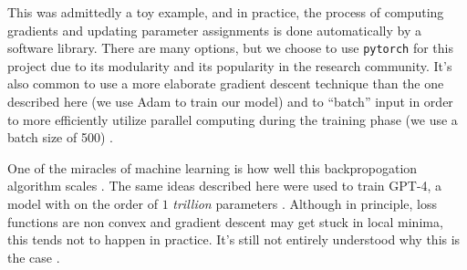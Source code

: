 This was admittedly a toy example, and in practice, the process of computing gradients and updating parameter assignments is done automatically by a software library. There are many options, but we choose to use \texttt{pytorch} \cite{pytorch} for this project due to its modularity and its popularity in the research community. It's also common to use a more elaborate gradient descent technique than the one described here (we use Adam \cite{adam} to train our model) and to ``batch'' input in order to more efficiently utilize parallel computing during the training phase (we use a batch size of 500) \cite[\S 10.7.2]{ISL}.

One of the miracles of machine learning is how well this backpropogation algorithm scales \cite[\S 13.2.6]{PML}. The same ideas described here were used to train GPT-4, a model with on the order of $1$ \emph{trillion} parameters \cite{gpt4}. Although in principle, loss functions are non convex and gradient descent may get stuck in local minima, this tends not to happen in practice. It's still not entirely understood why this is the case \cite[\S 13.4]{PML}.

